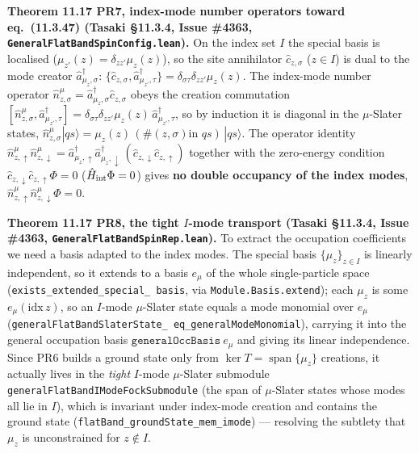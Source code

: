 \documentclass[a4paper,11pt]{article}
\begin{document}
\medskip\noindent\textbf{Theorem 11.17 PR7, index-mode number operators toward eq.~(11.3.47)
(Tasaki §11.3.4, Issue \#4363, \texttt{GeneralFlatBandSpinConfig.lean}).}  On the index set $I$ the
special basis is localised ($\mu_{z'}(z)=\delta_{zz'}\mu_z(z)$), so the site annihilator $\hat
c_{z,\sigma}$ ($z\in I$) is dual to the mode creator $\hat a^\dagger_{\mu_z,\sigma}$:
$\{\hat c_{z,\sigma},\hat a^\dagger_{\mu_{z'},\tau}\}=\delta_{\sigma\tau}\delta_{zz'}\mu_z(z)$.  The
index-mode number operator $\hat n^\mu_{z,\sigma}=\hat a^\dagger_{\mu_z,\sigma}\hat c_{z,\sigma}$
obeys the creation commutation $[\hat n^\mu_{z,\sigma},\hat a^\dagger_{\mu_{z'},\tau}]
=\delta_{\sigma\tau}\delta_{zz'}\mu_z(z)\,\hat a^\dagger_{\mu_{z'},\tau}$, so by induction it is
diagonal in the $\mu$-Slater states, $\hat n^\mu_{z,\sigma}|qs\rangle=\mu_z(z)\,(\#(z,\sigma)\text{
in }qs)\,|qs\rangle$.  The operator identity $\hat n^\mu_{z,\uparrow}\hat n^\mu_{z,\downarrow}
=\hat a^\dagger_{\mu_z,\uparrow}\hat a^\dagger_{\mu_z,\downarrow}\,(\hat c_{z,\downarrow}\hat
c_{z,\uparrow})$ together with the zero-energy condition $\hat c_{z,\downarrow}\hat
c_{z,\uparrow}\Phi=0$ ($\hat H_{\rm int}\Phi=0$) gives \textbf{no double occupancy of the index
modes}, $\hat n^\mu_{z,\uparrow}\hat n^\mu_{z,\downarrow}\Phi=0$.

\medskip\noindent\textbf{Theorem 11.17 PR8, the tight $I$-mode transport (Tasaki §11.3.4, Issue
\#4363, \texttt{GeneralFlatBandSpinRep.lean}).}  To extract the occupation coefficients we need a
basis adapted to the index modes.  The special basis $\{\mu_z\}_{z\in I}$ is linearly independent, so
it extends to a basis $e_\mu$ of the whole single-particle space (\texttt{exists\_extended\_special\_%
basis}, via \texttt{Module.Basis.extend}); each $\mu_z$ is some $e_\mu(\mathrm{idx}\,z)$, so an
$I$-mode $\mu$-Slater state equals a mode monomial over $e_\mu$ (\texttt{generalFlatBandSlaterState\_%
eq\_generalModeMonomial}), carrying it into the general occupation basis $\texttt{generalOccBasis}\
e_\mu$ and giving its linear independence.  Since PR6 builds a ground state only from $\ker T=%
\operatorname{span}\{\mu_z\}$ creations, it actually lives in the \emph{tight} $I$-mode $\mu$-Slater
submodule \texttt{generalFlatBandIModeFockSubmodule} (the span of $\mu$-Slater states whose modes all
lie in $I$), which is invariant under index-mode creation and contains the ground state
(\texttt{flatBand\_groundState\_mem\_imode}) --- resolving the subtlety that $\mu_z$ is unconstrained
for $z\notin I$.
\end{document}
